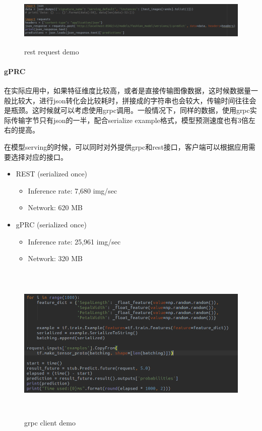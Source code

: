 \documentclass[12pt,a4paper,oneside]{article}
\begin{document}
\begin{CJK*}{UTF8}{gbsn}
\begin{figure}[H]
\centering
\includegraphics[width=6in,height=1.0in]{restrequest}
\caption{rest request demo}
\end{figure}

\paragraph{gPRC}
在实际应用中，如果特征维度比较高，或者是直接传输图像数据，这时候数据量一般比较大，进行json转化会比较耗时，拼接成的字符串也会较大，传输时间往往会是瓶颈。这时候就可以考虑使用grpc调用。一般情况下，同样的数据，使用grpc实际传输字节只有json的一半，配合serialize example格式，模型预测速度也有3倍左右的提高。

在模型serving的时候，可以同时对外提供grpc和rest接口，客户端可以根据应用需要选择对应的接口。

\begin{itemize}
\item REST (serialized once)
\begin{itemize}
\item Inference rate: 7,680 img/sec
\item Network: 620 MB
\end{itemize}
\item gPRC (serialized once)
\begin{itemize}
\item Inference rate: 25,961 img/sec
\item Network: 320 MB
\end{itemize}
\end{itemize}

\begin{figure}[H]
\centering
\includegraphics[width=6in,height=3.0in]{grpcclient}
\caption{grpc client demo}
\end{figure}



\end{CJK*}
\end{document}
